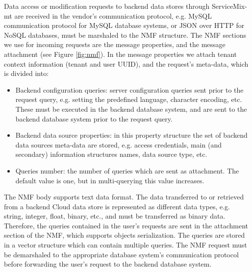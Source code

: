 Data access or modification requests to backend data stores through ServiceMix-mt are received in the vendor's communication protocol, e.g. MySQL communication protocol for MySQL database systems, or \ac{JSON} over \ac{HTTP} for \ac{NoSQL} databases, must be marshaled to the \ac{NMF} structure. The \ac{NMF} sections we use for incoming requests are the message properties, and the message attachment (see Figure \ref{fig:nmf}). In the message properties we attach tenant context information (tenant and user \ac{UUID}), and the request's meta-data, which is divided into:
	\begin{itemize}
		\item Backend configuration queries: server configuration queries sent prior to the request query, e.g. setting the predefined language, character encoding, etc. These must be executed in the backend database system, and are sent to the backend database system prior to the request query.
		\item Backend data source properties: in this property structure the set of backend data sources meta-data are stored, e.g. access credentials, main (and secondary) information structures names, data source type, etc.
		\item Queries number: the number of queries which are sent as attachment. The default value is one, but in multi-querying this value increases.
	\end{itemize}  

The \ac{NMF} body supports text data format. The data transferred to or retrieved from a backend Cloud data store is represented as different data types, e.g. string, integer, float, binary, etc., and must be transferred as binary data. Therefore, the queries contained in the user's requests are sent in the attachment section of the \ac{NMF}, which supports objects serialization. The queries are stored in a vector structure which can contain multiple queries. The \ac{NMF} request must be demarshaled to the appropriate database system's communication protocol before forwarding the user's request to the backend database system. 

